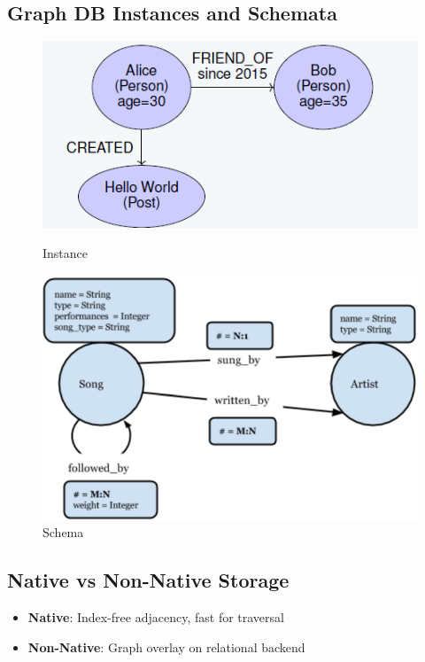 \documentclass{article}
\begin{document}
\subsection*{Graph DB Instances and Schemata}
\begin{figure}[ht]
    \begin{minipage}[b]{0.48\linewidth}
        \centering
        \includegraphics[width=\linewidth]{images/graph_db_instance.png}
        \caption{Instance}
    \end{minipage}
    \hfill
    \begin{minipage}[b]{0.48\linewidth}
        \includegraphics[width=\linewidth]{images/graph_db_schema.png}
        \caption{Schema}
    \end{minipage}
\end{figure}

\subsection*{Native vs Non-Native Storage}
\begin{itemize}
  \item \textbf{Native}: Index-free adjacency, fast for traversal
  \item \textbf{Non-Native}: Graph overlay on relational backend
\end{itemize}
\end{document}
